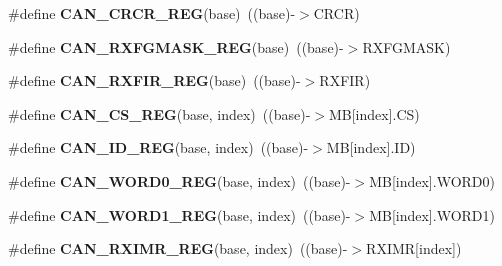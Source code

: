 \begin{DoxyCompactItemize}
\item 
\#define {\bfseries C\+A\+N\+\_\+\+C\+R\+C\+R\+\_\+\+R\+EG}(base)~((base)-\/$>$C\+R\+CR)\hypertarget{group__CAN__Register__Accessor__Macros_gaf0fb93bc80a71b8fa9087d18c7503186}{}\label{group__CAN__Register__Accessor__Macros_gaf0fb93bc80a71b8fa9087d18c7503186}

\item 
\#define {\bfseries C\+A\+N\+\_\+\+R\+X\+F\+G\+M\+A\+S\+K\+\_\+\+R\+EG}(base)~((base)-\/$>$R\+X\+F\+G\+M\+A\+SK)\hypertarget{group__CAN__Register__Accessor__Macros_ga7a5e529487aea1806a00f328ae0ec06c}{}\label{group__CAN__Register__Accessor__Macros_ga7a5e529487aea1806a00f328ae0ec06c}

\item 
\#define {\bfseries C\+A\+N\+\_\+\+R\+X\+F\+I\+R\+\_\+\+R\+EG}(base)~((base)-\/$>$R\+X\+F\+IR)\hypertarget{group__CAN__Register__Accessor__Macros_ga61ab5ba295876c0b3eee23094ea58ad0}{}\label{group__CAN__Register__Accessor__Macros_ga61ab5ba295876c0b3eee23094ea58ad0}

\item 
\#define {\bfseries C\+A\+N\+\_\+\+C\+S\+\_\+\+R\+EG}(base,  index)~((base)-\/$>$MB\mbox{[}index\mbox{]}.CS)\hypertarget{group__CAN__Register__Accessor__Macros_ga2c092376e84accc60ab30d58a90313a2}{}\label{group__CAN__Register__Accessor__Macros_ga2c092376e84accc60ab30d58a90313a2}

\item 
\#define {\bfseries C\+A\+N\+\_\+\+I\+D\+\_\+\+R\+EG}(base,  index)~((base)-\/$>$MB\mbox{[}index\mbox{]}.ID)\hypertarget{group__CAN__Register__Accessor__Macros_gab54aefacb08bef26ec56d7fbeb066fe6}{}\label{group__CAN__Register__Accessor__Macros_gab54aefacb08bef26ec56d7fbeb066fe6}

\item 
\#define {\bfseries C\+A\+N\+\_\+\+W\+O\+R\+D0\+\_\+\+R\+EG}(base,  index)~((base)-\/$>$MB\mbox{[}index\mbox{]}.W\+O\+R\+D0)\hypertarget{group__CAN__Register__Accessor__Macros_ga6c38c61f1d64c516230b88731857a4b8}{}\label{group__CAN__Register__Accessor__Macros_ga6c38c61f1d64c516230b88731857a4b8}

\item 
\#define {\bfseries C\+A\+N\+\_\+\+W\+O\+R\+D1\+\_\+\+R\+EG}(base,  index)~((base)-\/$>$MB\mbox{[}index\mbox{]}.W\+O\+R\+D1)\hypertarget{group__CAN__Register__Accessor__Macros_ga4202b53149fc2a037d1597d719f11dca}{}\label{group__CAN__Register__Accessor__Macros_ga4202b53149fc2a037d1597d719f11dca}

\item 
\#define {\bfseries C\+A\+N\+\_\+\+R\+X\+I\+M\+R\+\_\+\+R\+EG}(base,  index)~((base)-\/$>$R\+X\+I\+MR\mbox{[}index\mbox{]})\hypertarget{group__CAN__Register__Accessor__Macros_ga05f466b5d47a11a4920d35ef2374f9cb}{}\label{group__CAN__Register__Accessor__Macros_ga05f466b5d47a11a4920d35ef2374f9cb}


\end{DoxyCompactItemize}
